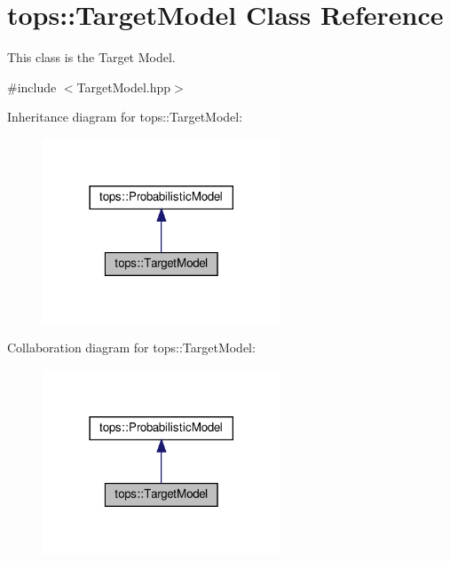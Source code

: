 \hypertarget{classtops_1_1TargetModel}{}\section{tops\+:\+:Target\+Model Class Reference}
\label{classtops_1_1TargetModel}


This class is the Target Model.  




{\ttfamily \#include $<$Target\+Model.\+hpp$>$}



Inheritance diagram for tops\+:\+:Target\+Model\+:
\nopagebreak
\begin{figure}[H]
\begin{center}
\leavevmode
\includegraphics[width=201pt]{classtops_1_1TargetModel__inherit__graph}
\end{center}
\end{figure}


Collaboration diagram for tops\+:\+:Target\+Model\+:
\nopagebreak
\begin{figure}[H]
\begin{center}
\leavevmode
\includegraphics[width=201pt]{classtops_1_1TargetModel__coll__graph}
\end{center}
\end{figure}
